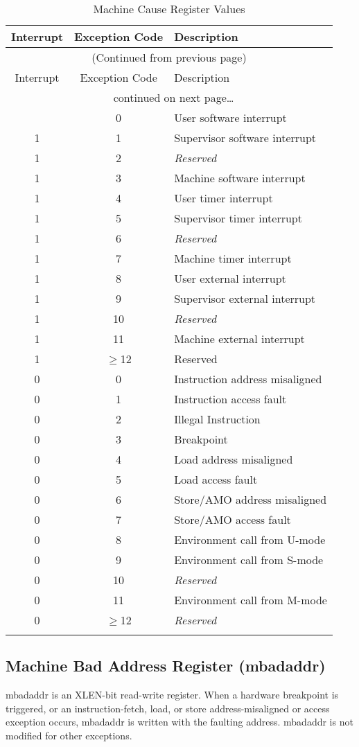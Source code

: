 \begin{longtable}[]{@{}ccl@{}}
\toprule
Interrupt & Exception Code & Description\tabularnewline
\midrule
\endfirsthead
\multicolumn{3}{c}{{(Continued from previous page)}} \\

\toprule
Interrupt & Exception Code & Description\tabularnewline
\midrule
\endhead

\midrule \multicolumn{3}{c}{{\tablename\ \thetable{} continued on next page\ldots}} \\
\endfoot

\endlastfoot
1 & 0 & User software interrupt\tabularnewline
1 & 1 & Supervisor software interrupt\tabularnewline
1 & 2 & \emph{Reserved}\tabularnewline
1 & 3 & Machine software interrupt\tabularnewline
1 & 4 & User timer interrupt\tabularnewline
1 & 5 & Supervisor timer interrupt\tabularnewline
1 & 6 & \emph{Reserved}\tabularnewline
1 & 7 & Machine timer interrupt\tabularnewline
1 & 8 & User external interrupt\tabularnewline
1 & 9 & Supervisor external interrupt\tabularnewline
1 & 10 & \emph{Reserved}\tabularnewline
1 & 11 & Machine external interrupt\tabularnewline
1 & $\geqslant$12 & Reserved\tabularnewline
\midrule
0 & 0 & Instruction address misaligned\tabularnewline
0 & 1 & Instruction access fault\tabularnewline
0 & 2 & Illegal Instruction\tabularnewline
0 & 3 & Breakpoint\tabularnewline
0 & 4 & Load address misaligned\tabularnewline
0 & 5 & Load access fault\tabularnewline
0 & 6 & Store/AMO address misaligned\tabularnewline
0 & 7 & Store/AMO access fault\tabularnewline
0 & 8 & Environment call from U-mode\tabularnewline
0 & 9 & Environment call from S-mode\tabularnewline
0 & 10 & \emph{Reserved}\tabularnewline
0 & 11 & Environment call from M-mode\tabularnewline
0 & $\geqslant$12 & \emph{Reserved}\tabularnewline
\bottomrule
\caption{Machine Cause Register Values}
\label{tab:mcause-reg-values}
\end{longtable}


\subsection{Machine Bad Address Register
(mbadaddr)}\label{machine-bad-address-register-mbadaddr}

mbadaddr is an XLEN-bit read-write register. When a hardware breakpoint
is triggered, or an instruction-fetch, load, or store address-misaligned
or access exception occurs, mbadaddr is written with the faulting
address. mbadaddr is not modified for other exceptions.

